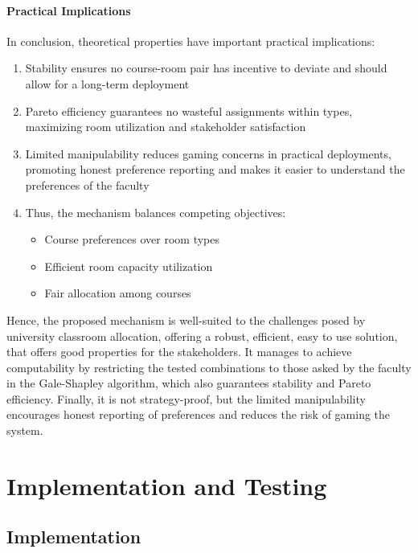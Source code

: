 \documentclass[a4paper, oneside]{article}
\theoremstyle{plain}
\begin{document}
\paragraph{Practical Implications}

In conclusion, theoretical properties have important practical implications:

\begin{enumerate}
    \item Stability ensures no course-room pair has incentive to deviate and should allow for a long-term deployment
    \item Pareto efficiency guarantees no wasteful assignments within types, maximizing room utilization and stakeholder satisfaction
    \item Limited manipulability reduces gaming concerns in practical deployments, promoting honest preference reporting and makes it easier to understand the preferences of the faculty
    \item Thus, the mechanism balances competing objectives:
        \begin{itemize}
            \item Course preferences over room types
            \item Efficient room capacity utilization
            \item Fair allocation among courses
        \end{itemize}
\end{enumerate}

Hence, the proposed mechanism is well-suited to the challenges posed by university classroom allocation, offering a robust, efficient, easy to use solution, 
that offers good properties for the stakeholders. It manages to achieve computability by restricting the tested combinations to those asked by the faculty
in the Gale-Shapley algorithm, which also guarantees stability and Pareto efficiency. Finally, it is not strategy-proof, but the limited manipulability 
encourages honest reporting of preferences and reduces the risk of gaming the system.

\section{Implementation and Testing}
\subsection{Implementation}
\end{document}

